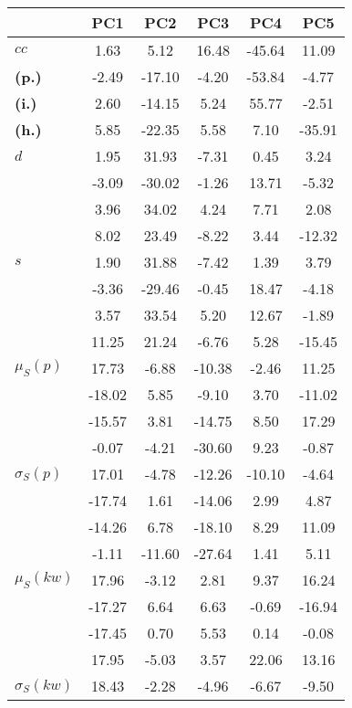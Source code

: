 \begin{table}[h!]
\begin{center}
\begin{tabular}{| l || c | c | c | c | c |}\hline
 & {\bf PC1} & {\bf PC2} & {\bf PC3} & {\bf PC4} & {\bf PC5} \\\hline\hline
{\bf $cc$} & 1.63 & 5.12 & 16.48 & -45.64 & 11.09 \\
{\bf (p.)} & -2.49 & -17.10 & -4.20 & -53.84 & -4.77 \\
{\bf (i.)} & 2.60 & -14.15 & 5.24 & 55.77 & -2.51 \\
{\bf (h.)} & 5.85 & -22.35 & 5.58 & 7.10 & -35.91 \\\hline
{\bf $d$} & 1.95 & 31.93 & -7.31 & 0.45 & 3.24 \\
{\bf } & -3.09 & -30.02 & -1.26 & 13.71 & -5.32 \\
{\bf } & 3.96 & 34.02 & 4.24 & 7.71 & 2.08 \\
{\bf } & 8.02 & 23.49 & -8.22 & 3.44 & -12.32 \\\hline
{\bf $s$} & 1.90 & 31.88 & -7.42 & 1.39 & 3.79 \\
{\bf } & -3.36 & -29.46 & -0.45 & 18.47 & -4.18 \\
 & 3.57  & 33.54  & 5.20  & 12.67  & -1.89 \\
 & 11.25  & 21.24  & -6.76  & 5.28  & -15.45 \\\hline
$\mu_S(p)$ & 17.73  & -6.88  & -10.38  & -2.46  & 11.25 \\
 & -18.02  & 5.85  & -9.10  & 3.70  & -11.02 \\
 & -15.57  & 3.81  & -14.75  & 8.50  & 17.29 \\
 & -0.07  & -4.21  & -30.60  & 9.23  & -0.87 \\\hline
$\sigma_S(p)$ & 17.01  & -4.78  & -12.26  & -10.10  & -4.64 \\
 & -17.74  & 1.61  & -14.06  & 2.99  & 4.87 \\
 & -14.26  & 6.78  & -18.10  & 8.29  & 11.09 \\
 & -1.11  & -11.60  & -27.64  & 1.41  & 5.11 \\\hline
$\mu_S(kw)$ & 17.96  & -3.12  & 2.81  & 9.37  & 16.24 \\
 & -17.27  & 6.64  & 6.63  & -0.69  & -16.94 \\
 & -17.45  & 0.70  & 5.53  & 0.14  & -0.08 \\
 & 17.95  & -5.03  & 3.57  & 22.06  & 13.16 \\\hline
$\sigma_S(kw)$ & 18.43  & -2.28  & -4.96  & -6.67  & -9.50 \\

\end{tabular}
\end{center}
\end{table}
